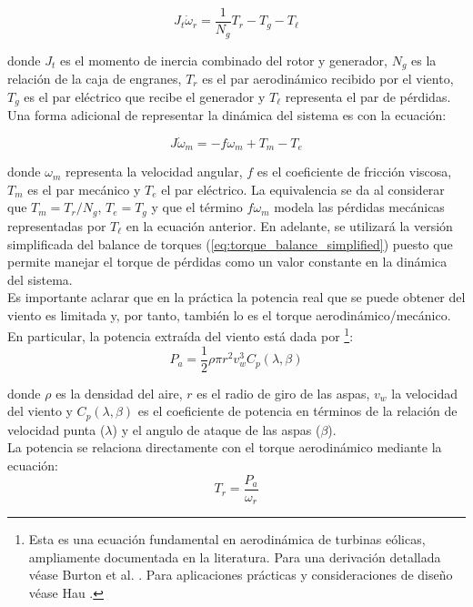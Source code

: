{\begin{equation}
    J_t \dot{\omega}_r = \frac{1}{N_g}T_r - T_g - T_\ell
    \label{eq:torque_balance_complete}
\end{equation}

donde $J_t$ es el momento de inercia combinado del rotor y generador, $N_g$ es la relación de la caja de engranes, $T_r$ 
es el par aerodinámico recibido por el viento, $T_g$ es el par eléctrico que recibe el generador y $T_\ell$ representa el par de pérdidas.
Una forma adicional de representar la dinámica del sistema es con la ecuación:

\begin{equation}
    J \dot{\omega}_m = -f \omega_m + T_m - T_e
    \label{eq:torque_balance_simplified}
\end{equation}

donde $\omega_m$ representa la velocidad angular, $f$ es el coeficiente de fricción viscosa, $T_m$ es el par mecánico 
y $T_e$ el par eléctrico. La equivalencia se da al considerar que $T_m = T_r/N_g$, $T_e = T_g$ y que el término 
$f\omega_m$ modela las pérdidas mecánicas representadas por $T_\ell$ en la ecuación anterior.
En adelante, se utilizará la versión simplificada del balance de torques (\ref{eq:torque_balance_simplified}) 
puesto que permite manejar el torque de pérdidas como un valor constante en la dinámica del sistema.
\\

Es importante aclarar que en la práctica la potencia real que se puede obtener del viento es limitada y, por 
tanto, también lo es el torque aerodinámico/mecánico. En particular, la potencia extraída del viento está dada por
\footnote{Esta es una ecuación fundamental en aerodinámica de turbinas eólicas, ampliamente documentada en 
la literatura. Para una derivación detallada véase Burton et al. \cite{Burton2011}. Para aplicaciones prácticas 
y consideraciones de diseño véase Hau \cite{Hau2013}.}:
\begin{equation}
    P_a = \frac{1}{2}\rho \pi r^2 v_w^3 C_p(\lambda,\beta)
    \label{eq:aerodynamic_power}
\end{equation}

donde $\rho$ es la densidad del aire, $r$ es el radio de giro de las aspas, $v_w$ la velocidad del viento y 
$C_p(\lambda,\beta)$ es el coeficiente de potencia en términos de la relación de velocidad punta ($\lambda$) y el angulo de ataque de las aspas ($\beta$).
\\

La potencia se relaciona directamente con el torque aerodinámico mediante la ecuación:
\begin{equation}
    T_r = \frac{P_a}{\omega_r}
    \label{eq:aerodynamic_torque}
\end{equation}

}
